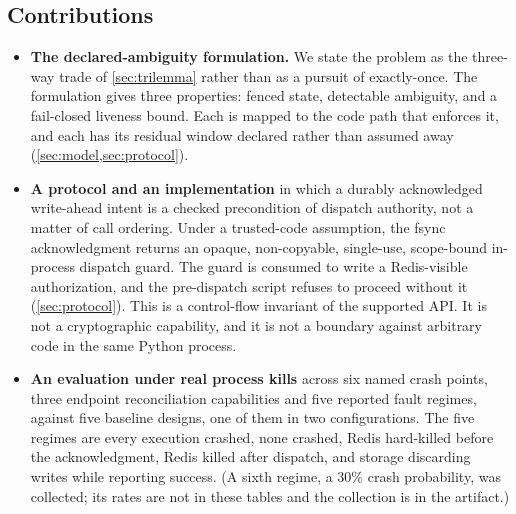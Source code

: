 \subsection{Contributions}

\begin{itemize}
\item[\textbf{C1}] \textbf{The declared-ambiguity formulation.} We state the
      problem as the three-way trade of \cref{sec:trilemma} rather than as a
      pursuit of exactly-once. The formulation gives three properties: fenced
      state, detectable ambiguity, and a fail-closed liveness bound. Each is
      mapped to the code path that enforces it, and each has its residual
      window declared rather than assumed away (\cref{sec:model,sec:protocol}).
\item[\textbf{C2}] \textbf{A protocol and an implementation} in which a
      durably acknowledged write-ahead intent is a checked precondition of
      dispatch authority, not a matter of call ordering. Under a trusted-code
      assumption, the fsync acknowledgment returns an opaque, non-copyable,
      single-use, scope-bound in-process dispatch guard. The guard is consumed
      to write a Redis-visible authorization, and the pre-dispatch script
      refuses to proceed without it (\cref{sec:protocol}). This is a
      control-flow invariant of the supported API. It is not a cryptographic
      capability, and it is not a boundary against arbitrary code in the same
      Python process.
\item[\textbf{C3}] \textbf{An evaluation under real process kills} across six
      named crash points, three endpoint reconciliation capabilities and
      five reported fault regimes, against five baseline designs, one of them
      in two configurations. The five regimes are every execution crashed,
      none crashed, Redis hard-killed before the acknowledgment, Redis killed
      after dispatch, and storage discarding writes while reporting success.
      (A sixth regime, a $30\%$ crash probability, was collected; its rates
      are not in these tables and the collection is in the artifact.)

\end{itemize}
